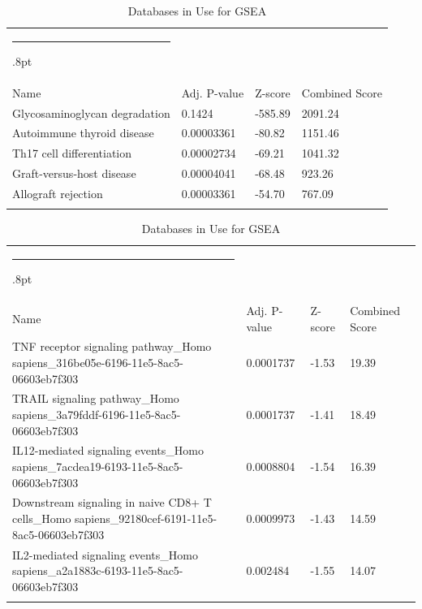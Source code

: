 \documentclass[3p,authoryear,preprint,12pt]{elsarticle}
\makeatletter
\def\hlinewd#1{%
  \noalign{\ifnum0=`}\fi\hrule \@height #1%
  \futurelet\reserved@a\@xhline}
\def\tbltoprule{\hlinewd{.8pt}\\[-12pt]}
\def\tblbottomrule{\noalign{\vspace*{6pt}}\hline\noalign{\vspace*{2pt}}}
\def\tblmidrule{\noalign{\vspace*{6pt}}\hline\noalign{\vspace*{2pt}}}
\makeatother
\begin{document}
\begin{table}[!htbp]
	\caption{{Databases in Use for GSEA} }
	\label{tw-de478ae31cc6}
	\def\arraystretch{1}
	\ignorespaces 
	\centering 
	\begin{tabulary}{\linewidth}{p{\dimexpr.65\tabcolsep}p{\dimexpr.15\tabcolsep}p{\dimexpr.1\tabcolsep}p{\dimexpr.1\tabcolsep}}
		\tbltoprule Name & Adj. P-value & Z-score & Combined Score\\
		\tblmidrule
Glycosaminoglycan degradation & 0.1424 & -585.89 & 2091.24 \\
Autoimmune thyroid disease & 0.00003361 & -80.82 & 1151.46 \\
Th17 cell differentiation & 0.00002734 & -69.21 & 1041.32 \\
Graft-versus-host disease & 0.00004041 & -68.48 & 923.26 \\
Allograft rejection & 0.00003361 & -54.70 & 767.09 \\
		\tblbottomrule
	\end{tabulary}\par 
\end{table}
\begin{table}[!htbp]
	\caption{{Databases in Use for GSEA} }
	\label{tw-de478ae31cc6}
	\def\arraystretch{1}
	\ignorespaces 
	\centering 
	\begin{tabulary}{\linewidth}{p{\dimexpr.65\tabcolsep}p{\dimexpr.15\tabcolsep}p{\dimexpr.1\tabcolsep}p{\dimexpr.1\tabcolsep}}
		\tbltoprule Name & Adj. P-value & Z-score & Combined Score\\
		\tblmidrule
TNF receptor signaling pathway\_Homo sapiens\_316be05e-6196-11e5-8ac5-06603eb7f303 & 0.0001737 & -1.53 & 19.39 \\
TRAIL signaling pathway\_Homo sapiens\_3a79fddf-6196-11e5-8ac5-06603eb7f303 & 0.0001737 & -1.41 & 18.49 \\
IL12-mediated signaling events\_Homo sapiens\_7acdea19-6193-11e5-8ac5-06603eb7f303 & 0.0008804 & -1.54 & 16.39 \\
Downstream signaling in naive CD8+ T cells\_Homo sapiens\_92180cef-6191-11e5-8ac5-06603eb7f303 & 0.0009973 & -1.43 & 14.59 \\
IL2-mediated signaling events\_Homo sapiens\_a2a1883c-6193-11e5-8ac5-06603eb7f303 & 0.002484 & -1.55 & 14.07 \\
		\tblbottomrule
	\end{tabulary}\par 
\end{table}
\end{document}
